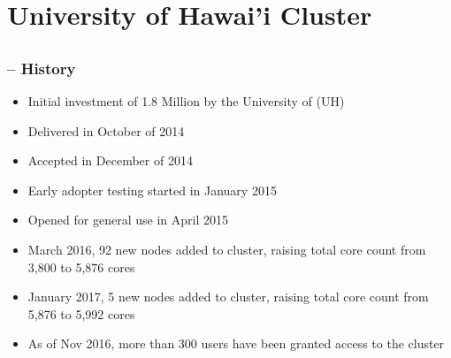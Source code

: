 \section{University of Hawai'i Cluster}

\subsection{{\craycs}}
\begin{frame}
\frametitle{{\craycs} -- History}
\begin{itemize}
 \item Initial investment of 1.8 Million by the University of {\hawaii} (UH)
 \item Delivered in October of 2014
 \item Accepted in December of 2014 
 \item Early adopter testing started in January 2015
 \item Opened for general use in April 2015
 \item March 2016, 92 new nodes added to cluster, raising total core count from 3,800 to 5,876 cores
 \item January 2017, 5 new nodes added to cluster, raising total core count from 5,876 to 5,992 cores
 \item As of Nov 2016, more than 300 users have been granted access to the cluster
\end{itemize}
\end{frame}


